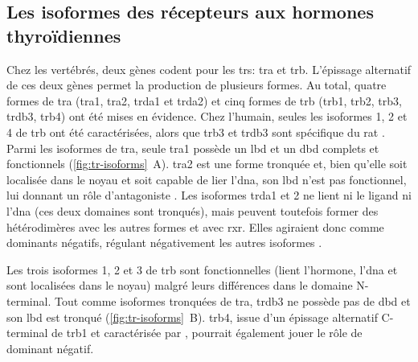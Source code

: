 
\subsection{Les isoformes des récepteurs aux hormones thyroïdiennes}
Chez les vertébrés, deux gènes codent pour les \glspl{tr}: \gls{tra} et \gls{trb}.
L'épissage alternatif de ces deux gènes permet la production de plusieurs formes.
Au total, quatre formes de \gls{tra} (\gls{tra}1, \gls{tra}2, \gls{trda}1 et \gls{trda}2) et cinq formes de \gls{trb} (\gls{trb}1, \gls{trb}2, \gls{trb}3, \gls{trdb}3, \gls{trb}4) ont été mises en évidence.
Chez l'humain, seules les isoformes 1, 2 et 4 de \gls{trb} ont été caractérisées, alors que \gls{trb}3 et \gls{trdb}3 sont spécifique du rat \citep{Williams2000}.
Parmi les isoformes de \gls{tra}, seule \gls{tra}1 possède un \gls{lbd} et un \gls{dbd} complets et fonctionnels (\autoref{fig:tr-isoforms}~A).
\gls{tra}2 est une forme tronquée et, bien qu'elle soit localisée dans le noyau et soit capable de lier l'\gls{dna}, son \gls{lbd} n'est pas fonctionnel, lui donnant un rôle d'antagoniste \citep{Chassande1997}.
Les isoformes \gls{trda}1 et 2 ne lient ni le ligand ni l'\gls{dna} (ces deux domaines sont tronqués), mais peuvent toutefois former des hétérodimères avec les autres formes et avec \gls{rxr}.
Elles agiraient donc comme dominants négatifs, régulant négativement les autres isoformes \citep{Plateroti2001}.



Les trois isoformes 1, 2 et 3 de \gls{trb} sont fonctionnelles (lient l'hormone, l'\gls{dna} et sont localisées dans le noyau) malgré leurs différences dans le domaine N-terminal.
Tout comme isoformes tronquées de \gls{tra}, \gls{trdb}3 ne possède pas de \gls{dbd} et son \gls{lbd} est tronqué (\autoref{fig:tr-isoforms}~B).
\gls{trb}4, issue d'un épissage alternatif C-terminal de \gls{trb}1 et caractérisée par \citet{Tagami2010}, pourrait également jouer le rôle de dominant négatif.

